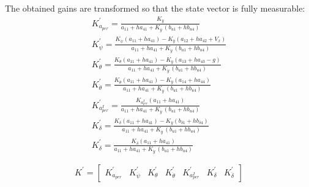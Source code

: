 The obtained gains are transformed so that the state vector is fully measurable:
\begin{eqnarray}
K_{a_{per}}^{'}=\frac{K_{\dot{y}}}{a_{11}+ha_{41}+K_{\dot{y}}\,(b_{u1}+hb_{u4})} \\[10pt]
K_{\dot{\psi}}^{'}=\frac{K_{\dot{\psi}}(a_{11}+ha_{41})-K_{\dot{y}}(a_{12}+ha_{42}+V_{x})}{a_{11}+ha_{41}+K_{\dot{y}}\,(b_{u1}+hb_{u4})} \\[10pt]
K_{\theta}^{'}=\frac{K_{\theta}(a_{11}+ha_{41})-K_{\dot{y}}(a_{13}+ha_{43}-g)}{a_{11}+ha_{41}+K_{\dot{y}}\,(b_{u1}+hb_{u4})} \\[10pt]
K_{\dot{\theta}}^{'}=\frac{K_{\dot{\theta}}(a_{11}+ha_{41})-K_{\dot{y}}(a_{14}+ha_{44})}{a_{11}+ha_{41}+K_{\dot{y}}\,(b_{u1}+hb_{u4})} \\[10pt]
K_{a_{per}^{I}}^{'}=\frac{K_{a_{per}^{I}}(a_{11}+ha_{41})}{a_{11}+ha_{41}+K_{\dot{y}}\,(b_{u1}+hb_{u4})} \\[10pt]
K_{\delta}^{'}=\frac{K_{\delta}(a_{11}+ha_{41})-K_{\dot{y}}(b_{\delta 1}+hb_{\delta 4})}{a_{11}+ha_{41}+K_{\dot{y}}\,(b_{u1}+hb_{u4})} \\[10pt]
K_{\dot{\delta}}^{'}=\frac{K_{\dot{\delta}}(a_{11}+ha_{41})}{a_{11}+ha_{41}+K_{\dot{y}}\,(b_{u1}+hb_{u4})}
\end{eqnarray}

\[K^{'}=\begin{bmatrix}
K_{a_{per}}^{'} & K_{\dot{\psi}}^{'} & K_{\theta}^{'} & K_{\dot{\theta}}^{'} & K_{a_{per}^{I}}^{'} & K_{\delta}^{'} & K_{\dot{\delta}}^{'}
\end{bmatrix} \]


